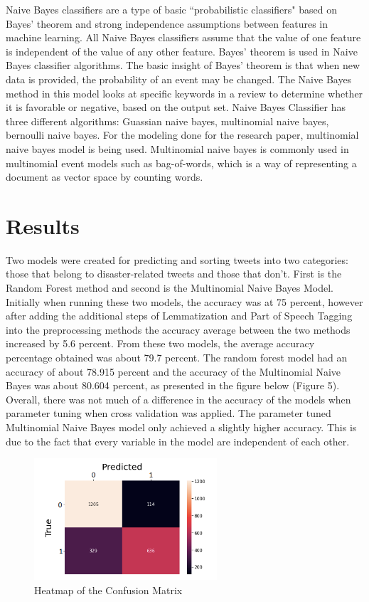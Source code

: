 \documentclass{article}
\begin{document}
Naive Bayes classifiers are a type of basic ``probabilistic classifiers" based on Bayes' theorem and strong independence assumptions between features in machine learning. All Naive Bayes classifiers assume that the value of one feature is independent of the value of any other feature. Bayes' theorem is used in Naive Bayes classifier algorithms. The basic insight of Bayes' theorem is that when new data is provided, the probability of an event may be changed. The Naive Bayes method in this model looks at specific keywords in a review to determine whether it is favorable or negative, based on the output set. Naive Bayes Classifier has three different algorithms: Guassian naive bayes, multinomial naive bayes, bernoulli naive bayes. For the modeling done for the research paper, multinomial naive bayes model is being used. Multinomial naive bayes is commonly used in multinomial event models such as bag-of-words, which is a way of representing a document as vector space by counting words.


\section{Results}

Two models were created for predicting and sorting tweets into two categories: those that belong to disaster-related tweets and those that don't. First is the Random Forest method and second is the Multinomial Naive Bayes Model. Initially when running these two models, the accuracy was at 75 percent, however after adding the additional steps of Lemmatization and Part of Speech Tagging into the preprocessing methods the accuracy average between the two methods increased by 5.6 percent. From these two models, the average accuracy percentage obtained was  about 79.7 percent. The random forest model had an accuracy of about 78.915 percent and the accuracy of the Multinomial Naive Bayes was about 80.604 percent, as presented in the figure below (Figure 5). Overall, there was not much of a difference in the accuracy of the models when parameter tuning when cross validation was applied. The parameter tuned Multinomial Naive Bayes model only achieved a slightly higher accuracy. This is due to the fact that every variable in the model are independent of each other. 


\begin{figure}[!h]
    \centering
    \includegraphics[width=0.607\textwidth, left]{heatmap.png}
    \caption{Heatmap of the Confusion Matrix}
    \label{fig:bar}
\end{figure}
\end{document}
